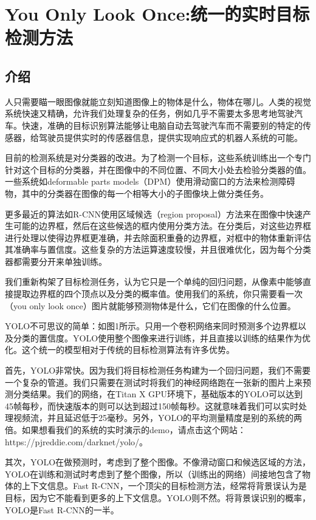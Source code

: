 
\chapter{You Only Look Once:统一的实时目标检测方法}

\section{介绍}

人只需要瞄一眼图像就能立刻知道图像上的物体是什么，物体在哪儿。人类的视觉系统快速又精确，允许我们处理复杂的任务，例如几乎不需要太多思考地驾驶汽车。快速，准确的目标识别算法能够让电脑自动去驾驶汽车而不需要别的特定的传感器，给驾驶员提供实时的传感器信息，提供实现响应式的机器人系统的可能。

目前的检测系统是对分类器的改进。为了检测一个目标，这些系统训练出一个专门针对这个目标的分类器，并在图像中的不同位置、不同大小处去检验分类器的值。一些系统如deformable parts models（DPM）使用滑动窗口的方法来检测障碍物，其中的分类器在图像的每一个相等大小的子图像块上做分类任务。

更多最近的算法如R-CNN使用区域候选（region proposal）方法来在图像中快速产生可能的边界框，然后在这些候选的框内使用分类方法。在分类后，对这些边界框进行处理以使得边界框更准确，并去除面积重叠的边界框，对框中的物体重新评估其准确率与置信度。这些复杂的方法运算速度较慢，并且很难优化，因为每个分类器都需要分开来单独训练。

我们重新构架了目标检测任务，认为它只是一个单纯的回归问题，从像素中能够直接提取边界框的四个顶点以及分类的概率值。使用我们的系统，你只需要看一次（you only look once）图片就能够预测物体是什么，它们在图像的什么位置。

YOLO不可思议的简单：如图1所示。只用一个卷积网络来同时预测多个边界框以及分类的置信度。YOLO使用整个图像来进行训练，并且直接以训练的结果作为优化。这个统一的模型相对于传统的目标检测算法有许多优势。

首先，YOLO非常快。因为我们将目标检测任务构建为一个回归问题，我们不需要一个复杂的管道。我们只需要在测试时将我们的神经网络跑在一张新的图片上来预测分类结果。我们的网络，在Titan X GPU环境下，基础版本的YOLO可以达到45帧每秒，而快速版本的则可以达到超过150帧每秒。这就意味着我们可以实时处理视频流，并且延迟低于25毫秒。另外，YOLO的平均测量精度是别的系统的两倍。如果想看我们的系统的实时演示的demo，请点击这个网站：https://pjreddie.com/darknet/yolo/。

其次，YOLO在做预测时，考虑到了整个图像。不像滑动窗口和候选区域的方法，YOLO在训练和测试时考虑到了整个图像，所以（训练出的网络）间接地包含了物体的上下文信息。Fast R-CNN，一个顶尖的目标检测方法，经常将背景误认为是目标，因为它不能看到更多的上下文信息。YOLO则不然。将背景误识别的概率，YOLO是Fast R-CNN的一半。

